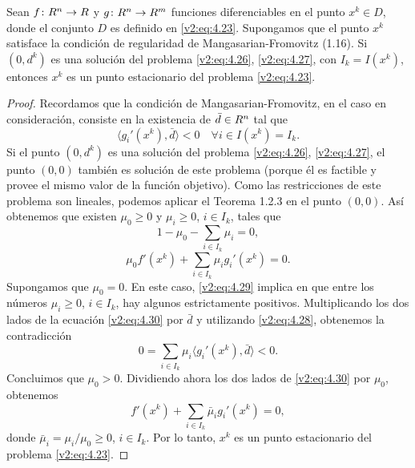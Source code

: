 \begin{proposition}\label{v2:prop:4.2.1}
    Sean $f \colon R^n \to R$ y $g \colon R^n \to R^m$ funciones diferenciables en el punto $x^k \in D$, donde el conjunto $D$ es definido en \eqref{v2:eq:4.23}. Supongamos que el punto $x^k$ satisface la condición de regularidad de Mangasarian-Fromovitz (1.16).
    Si $(0, d^k)$ es una solución del problema \eqref{v2:eq:4.26}, \eqref{v2:eq:4.27}, con $I_k = I(x^k)$, entonces $x^k$ es un punto estacionario del problema \eqref{v2:eq:4.23}.
\end{proposition}
\begin{proof}
    Recordamos que la condición de Mangasarian-Fromovitz, en el caso en consideración, consiste en la existencia de $\bar{d} \in R^n$ tal que
    \begin{equation}
        \langle g_i'(x^k), \bar{d} \rangle < 0 \quad \forall i \in I(x^k) = I_k.
        \label{v2:eq:4.28}
    \end{equation}
    Si el punto $(0, d^k)$ es una solución del problema \eqref{v2:eq:4.26}, \eqref{v2:eq:4.27}, el punto $(0, 0)$ también es solución de este problema (porque él es factible y provee el mismo valor de la función objetivo). Como las restricciones de este problema son lineales, podemos aplicar el Teorema 1.2.3 en el punto $(0, 0)$. Así obtenemos que existen $\mu_0 \ge 0$ y $\mu_i \ge 0$, $i \in I_k$, tales que
    \begin{equation}
        1 - \mu_0 - \sum_{i \in I_k} \mu_i = 0,
        \label{v2:eq:4.29}
    \end{equation}
    \begin{equation}
        \mu_0 f'(x^k) + \sum_{i \in I_k} \mu_i g_i'(x^k) = 0.
        \label{v2:eq:4.30}
    \end{equation}
    Supongamos que $\mu_0 = 0$. En este caso, \eqref{v2:eq:4.29} implica en que entre los números $\mu_i \ge 0$, $i \in I_k$, hay algunos estrictamente positivos. Multiplicando los dos lados de la ecuación \eqref{v2:eq:4.30} por $\bar{d}$ y utilizando \eqref{v2:eq:4.28}, obtenemos la contradicción
    \[
        0 = \sum_{i \in I_k} \mu_i \langle g_i'(x^k), \bar{d} \rangle < 0.
    \]
    Concluimos que $\mu_0 > 0$.
    Dividiendo ahora los dos lados de \eqref{v2:eq:4.30} por $\mu_0$, obtenemos
    \[
        f'(x^k) + \sum_{i \in I_k} \bar{\mu}_i g_i'(x^k) = 0,
    \]
    donde $\bar{\mu}_i = \mu_i / \mu_0 \ge 0$, $i \in I_k$. Por lo tanto, $x^k$ es un punto estacionario del problema \eqref{v2:eq:4.23}.
\end{proof}

